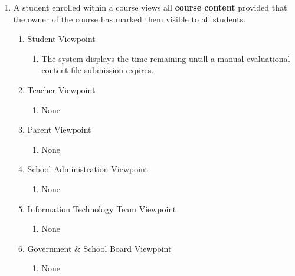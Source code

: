 \documentclass[]{article}
\begin{document}
\begin{enumerate}[{BE}1.]
	\item A student enrolled within a course views all \textbf{course content}
provided that the owner of the course has marked them visible to all students.
	\begin{enumerate}[{VP2}.1]
		\item Student Viewpoint
			\begin{enumerate}
				\item The system displays the time remaining untill a manual-evaluational
content file submission expires.
			\end{enumerate}
		\item Teacher Viewpoint
			\begin{enumerate}
				\item None
			\end{enumerate}
		\item Parent Viewpoint
			\begin{enumerate}
				\item None
			\end{enumerate}
		\item School Administration Viewpoint
			\begin{enumerate}
				\item None
			\end{enumerate}
		\item Information Technology Team Viewpoint
			\begin{enumerate}
				\item None
			\end{enumerate}
		\item Government \& School Board Viewpoint
			\begin{enumerate}
				\item None
			\end{enumerate}
	\end{enumerate}



\end{enumerate}
\end{document}
